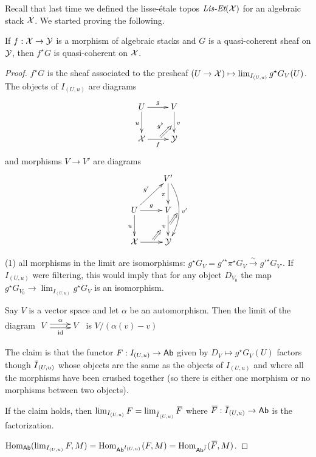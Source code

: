  
Recall that last time we defined the lisse-\'etale topos $\text{\it Lis-Et}(\mathcal{X})$ for an algebraic stack $\mathcal{X}$. We started proving the following.
\begin{proposition}
  If $f:\mathcal{X}\to \mathcal{Y}$ is a morphism of algebraic stacks and $G$ is a quasi-coherent sheaf on $\mathcal{Y}$, then $f^\star G$ is quasi-coherent on $\mathcal{X}$.
\end{proposition}
\begin{proof}
  $f^\star G$ is the sheaf associated to the presheaf $(U\to \mathcal{X})\mapsto \lim_{I_{(U,u)}} g^\star G_V(U)$. The objects of $I_{(U,u)}$ are diagrams 
 \[\xymatrix{
  U\ar[r]^g\ar[d]_u & V\ar[d]^v_{}="a"\\
  \X\ar[r]_f^{}="b" & \Y
  \ar@{=>}^{g^\flat} "b";"a"
 }\]
 and morphisms $V\to V'$ are diagrams
 \[\xymatrix{
  & V'\ar[d]_\pi \ar@/^3ex/[dd]^{v'}_{}="d"\\
  U\ar[d]_u\ar[r]^g \ar[ur]^{g'}& V\ar[d]_v="b"^{}="c"\\
  \X\ar[r]^{}="a"& \Y
  \ar@{=>} "a";"b" \ar@{=>} "c";"d"
 }\]

 (1) all morphisms in the limit are isomorphisms: $g^\star G_V= g'^\star \pi^\star G_V \xrightarrow\sim g'^\star G_{V'}$. If $I_{(U,u)}$ were filtering, this would imply that for any object $D_{V_0}$ the map $g^\star G_{V_0}\to \lim_{I_{(U,u)}} g^\star G_V$ is an isomorphism.
\begin{example}
 Say $V$ is a vector space and let $\alpha$ be an automorphism. Then the limit of the diagram $\xymatrix{V\ar@<.5ex>[r]^\alpha \ar@<-.5ex>[r]_\id & V}$ is $V/(\alpha(v)-v)$
\end{example}
The claim is that the functor $F:I_{(U,u)}\to \text{\sf Ab}$ given by $D_V\mapsto g^\star G_V(U)$ factors though $\bbar I_{(U,u)}$ whose objects are the same as the objects of $I_{(U,u)}$ and where all the morphisms have been crushed together (so there is either one morphism or no morphisms between two objects).

If the claim holds, then $\lim_{I_{(U,u)}}F = \lim_{\bbar I_{(U,u)}} \bbar F$ where $\bbar F:\bbar I_{(U,u)}\to \ab$ is the factorization.

$\hom_{\ab}(\lim_{I_{(U,u)}} F,M)=\hom_{\ab^{I_{(U,u)}}} (F,M) = \hom_{\ab^{\bbar I}} (\bbar F,M)$.


\end{proof}
